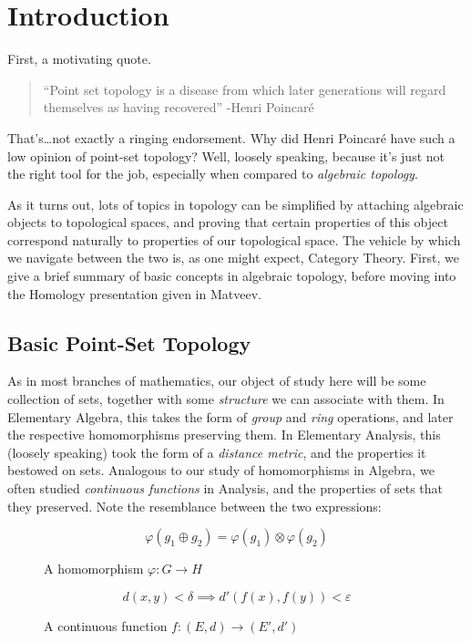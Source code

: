 \documentclass{fkbook}
\begin{document}
\section{Introduction}
\begin{adjustwidth}{1em}{1em}
  First, a motivating quote.
  \begin{quote}
    ``Point set topology is a disease from which later generations
    will regard themselves as having recovered'' -Henri Poincar\'{e}
  \end{quote}
  That's\ldots not exactly a ringing endorsement. Why did Henri
  Poincar\'{e} have such a low opinion of point-set topology? Well,
  loosely speaking, because it's just not the right tool for the job,
  especially when compared to \emph{algebraic topology}.

  As it turns out, lots of topics in topology can be simplified by
  attaching algebraic objects to topological spaces, and proving that
  certain properties of this object correspond naturally to properties
  of our topological space. The vehicle by which we navigate between
  the two is, as one might expect, Category Theory. First, we give a
  brief summary of basic concepts in algebraic topology, before moving
  into the Homology presentation given in Matveev.

  \subsection{Basic Point-Set Topology}
  As in most branches of mathematics, our object of study here will be
  some collection of sets, together with some \emph{structure} we can
  associate with them. In Elementary Algebra, this takes the form of
  \emph{group} and \emph{ring} operations, and later the respective
  homomorphisms preserving them. In Elementary Analysis, this (loosely
  speaking) took the form of a \emph{distance metric}, and the
  properties it bestowed on sets. Analogous to our study of
  homomorphisms in Algebra, we often studied \emph{continuous
    functions} in Analysis, and the properties of sets that they
  preserved. Note the resemblance between the two expressions:
  \begin{minipage}[H]{.49\linewidth}
    \begin{figure}[H]
      \centering
      \[
        \varphi(g_1 \oplus g_2) = \varphi(g_1) \otimes \varphi(g_2)
      \]
      \caption*{A homomorphism $\varphi : G \to H$}
    \end{figure}
  \end{minipage}
  \begin{minipage}[H]{.49\linewidth}
    \begin{figure}[H]
      \centering
      \[
        d(x,y) < \delta \implies d'(f(x), f(y)) < \varepsilon
      \]
      \caption*{A continuous function $f : (E,d) \to (E', d')$}
    \end{figure}
  \end{minipage}


\end{adjustwidth}
\end{document}
